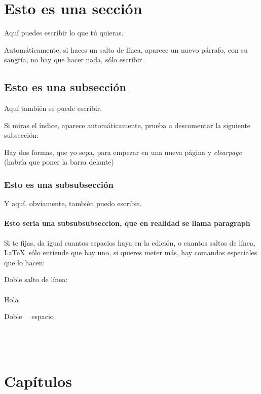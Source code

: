 \documentclass{article}
\begin{document}
\section{Esto es una sección}
\label{sec:seccion1}
Aquí puedes escribir lo que tú quieras.

Automáticamente, si haces un salto de línea, aparece un nuevo párrafo, con su sangría, no hay que hacer nada, sólo escribir.

\subsection{Esto es una subsección}
Aquí también se puede escribir.

Si miras el índice, aparece automáticamente, prueba a descomentar la siguiente subsección:


Hay dos formas, que yo sepa, para empezar en una nueva página
\newpage
y \textit{clearpage} (habría que poner la barra delante)

\subsubsection{Esto es una subsubsección}
Y aquí, obviamente, también puedo escribir.

\paragraph{Esto seria una subsubsubseccion, que en realidad se llama paragraph}


Si te fijas, da igual cuantos espacios       haya en la edición, o cuantos saltos de línea, \LaTeX \ sólo entiende que hay uno, si quieres meter más, hay comandos especiales que lo hacen:

Doble salto de línea:\\ \\


Hola


Doble  \ \  espacio \\ \\ \\ \\

\section{Capítulos}
\end{document}
